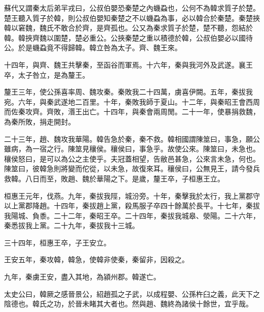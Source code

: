 蘇代又謂秦太后弟羋戎曰，公叔伯嬰恐秦楚之內蟣蝨也，公何不為韓求質子於楚。楚王聽入質子於韓，則公叔伯嬰知秦楚之不以蟣蝨為事，必以韓合於秦楚。秦楚挾韓以窘魏，魏氏不敢合於齊，是齊孤也。公又為秦求質子於楚，楚不聽，怨結於韓。韓挾齊魏以圍楚，楚必重公。公挾秦楚之重以積德於韓，公叔伯嬰必以國待公。於是蟣蝨竟不得歸韓。韓立咎為太子。齊、魏王來。

十四年，與齊、魏王共擊秦，至函谷而軍焉。十六年，秦與我河外及武遂。襄王卒，太子咎立，是為釐王。

釐王三年，使公孫喜率周、魏攻秦。秦敗我二十四萬，虜喜伊闕。五年，秦拔我宛。六年，與秦武遂地二百里。十年，秦敗我師于夏山。十二年，與秦昭王會西周而佐秦攻齊。齊敗，湣王出亡。十四年，與秦會兩周閒。二十一年，使暴捐救魏，為秦所敗，捐走開封。

二十三年，趙、魏攻我華陽。韓告急於秦，秦不救。韓相國謂陳筮曰，事急，願公雖病，為一宿之行。陳筮見穰侯。穰侯曰，事急乎。故使公來。陳筮曰，未急也。穰侯怒曰，是可以為公之主使乎。夫冠蓋相望，告敝邑甚急，公來言未急，何也。陳筮曰，彼韓急則將變而佗從，以未急，故復來耳。穰侯曰，公無見王，請今發兵救韓。八日而至，敗趙、魏於華陽之下。是歲，釐王卒，子桓惠王立。

桓惠王元年，伐燕。九年，秦拔我陘，城汾旁。十年，秦擊我於太行，我上黨郡守以上黨郡降趙。十四年，秦拔趙上黨，殺馬服子卒四十餘萬於長平。十七年，秦拔我陽城、負黍。二十二年，秦昭王卒。二十四年，秦拔我城皋、滎陽。二十六年，秦悉拔我上黨。二十九年，秦拔我十三城。

三十四年，桓惠王卒，子王安立。

王安五年，秦攻韓，韓急，使韓非使秦，秦留非，因殺之。

九年，秦虜王安，盡入其地，為潁州郡。韓遂亡。

太史公曰，韓厥之感晉景公，紹趙孤之子武，以成程嬰、公孫杵臼之義，此天下之陰德也。韓氏之功，於晉未睹其大者也。然與趙、魏終為諸侯十餘世，宜乎哉。